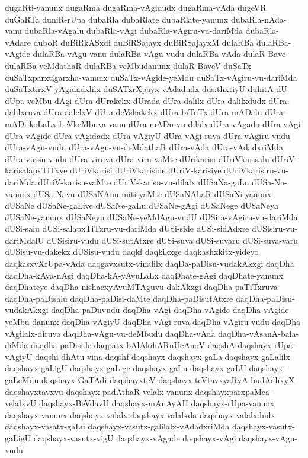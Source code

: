 {dugaRti-yanunx
dugaRma
dugaRma-vAgidudx
dugaRma-vAda
dugeVR
duGaRTa
duniR-rUpa
dubaRla
dubaRlate
dubaRlate-yanunx
dubaRla-nAda-vanu
dubaRla-vAgalu
dubaRla-vAgi
dubaRla-vAgiru-vu-dariMda
dubaRla-vAdare
duboR
duBiRkASxdi
duBiRSajayx
duBiRSajayxM
dulaRBa
dulaRBa-vAgide
dulaRBa-vAgu-vanu
dulaRBa-vAgu-vudu
dulaRBa-vAda
dulaR-Bave
dulaRBa-veMdathaR
dulaRBa-veMbudanunx
dulaR-BaveV
duSaTx
duSaTxparxtigarxha-vanunx
duSaTx-vAgide-yeMdu
duSaTx-vAgiru-vu-dariMda
duSaTxtirxV-yAgidadxlilx
duSATxrXpayx-vAdadudx
dusithxtiyU
duhitA
dU
dUpa-veMbu-dAgi
dUra
dUrakekx
dUrada
dUra-dalilx
dUra-dalilxdudx
dUra-dalilxruva
dUra-dalelxV
dUra-deVshakekx
dUra-biTuTx
dUra-mADalu
dUra-mADi-koLaLx-beVkeMbuva-vanu
dUra-mADu-vu-dilalx
dUra-vAgada
dUra-vAgi
dUra-vAgide
dUra-vAgidadx
dUra-vAgiyU
dUra-vAgi-ruva
dUra-vAgiru-vudu
dUra-vAgu-vudu
dUra-vAgu-vu-deMdathaR
dUra-vAda
dUra-vAdadxriMda
dUra-virisu-vudu
dUra-viruva
dUra-viru-vaMte
dUrikarisi
dUriVkarisalu
dUriV-karisalapxTiTxve
dUriVkarisi
dUriVkariside
dUriV-karisiye
dUriVkarisiru-vu-dariMda
dUriV-karisu-vaMte
dUriV-karisu-vu-dilalx
dUSaNa-gaLu
dUSa-Na-vanunx
dUSa-Navu
dUSaNAnu-miti-yaMte
dUSaNAhaR
dUSaNi-yanunx
dUSaNe
dUSaNe-gaLive
dUSaNe-gaLu
dUSaNe-gAgi
dUSaNege
dUSaNeya
dUSaNe-yanunx
dUSaNeyu
dUSaNe-yeMdAgu-vudU
dUSita-vAgiru-vu-dariMda
dUSi-salu
dUSi-salapxTiTxru-vu-dariMda
dUSi-side
dUSi-sidAdxre
dUSisiru-vu-dariMdalU
dUSisiru-vudu
dUSi-sutAtxre
dUSi-suva
dUSi-suvaru
dUSi-suva-varu
dUSisu-vu-dakekx
dUSisu-vudu
daqkf
daqkikxge
daqkashxkitx-yideyo
daqkasxvXrUpa-vAda
daqgavxsutx-vinalilx
daqDa-paDisu-vudakAkxgi
daqDha
daqDha-kAya-nAgi
daqDha-kA-yAvuLaLx
daqDhate-gAgi
daqDhate-yanunx
daqDhateye
daqDha-nishacxyAvuMTAguvu-dakAkxgi
daqDha-paTiTxruva
daqDha-paDisalu
daqDha-paDisi-daMte
daqDha-paDisutAtxre
daqDha-paDisu-vudakAkxgi
daqDha-paDuvudu
daqDha-vAgi
daqDha-vAgide
daqDha-vAgide-yeMbu-danunx
daqDha-vAgiyU
daqDha-vAgi-ruva
daqDha-vAgiru-vudu
daqDha-vAgilalx-diruva
daqDha-vAgu-vu-deMbudu
daqDha-vAda
daqDha-vAsanA-bala-diMda
daqdha-paDiside
daqpatx-bAlAkihARnUcAnoV
daqshA-daqshayx-rUpa-vAgiyU
daqshi-dhAtu-vina
daqshf
daqshayx
daqshayx-gaLa
daqshayx-gaLalilx
daqshayx-gaLigU
daqshayx-gaLige
daqshayx-gaLu
daqshayx-gaLU
daqshayx-gaLeMdu
daqshayx-GaTAdi
daqshayxteV
daqshayx-teVtavxyaRyA-budAdhxyX
daqshayxtavxvu
daqshayx-padAthaR-velalx-vanunx
daqshayxparxpaMca-velalxvU
daqshayx-BeVdavU
daqshayx-mAnAyAH
daqshayx-rUpa-vanunx
daqshayx-vanunx
daqshayx-valalx
daqshayx-valalxda
daqshayx-valalxdudx
daqshayx-vasatx-gaLu
daqshayx-vasutx-galilalx-vAdadxriMda
daqshayx-vasutx-gaLigU
daqshayx-vasutx-vigU
daqshayx-vAgade
daqshayx-vAgi
daqshayx-vAgu-vudu
}
